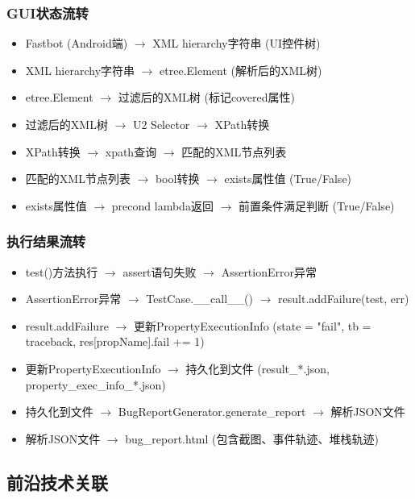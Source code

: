 \documentclass[a4paper, zihao=-4]{ctexart}
\begin{document}
\subsubsection{GUI状态流转}
\begin{itemize}
    \item Fastbot (Android端) $\rightarrow$ XML hierarchy字符串 (UI控件树)
    \item XML hierarchy字符串 $\rightarrow$ etree.Element (解析后的XML树)
    \item etree.Element $\rightarrow$ 过滤后的XML树 (标记covered属性)
    \item 过滤后的XML树 $\rightarrow$ U2 Selector $\rightarrow$ XPath转换
    \item XPath转换 $\rightarrow$ xpath查询 $\rightarrow$ 匹配的XML节点列表
    \item 匹配的XML节点列表 $\rightarrow$ bool转换 $\rightarrow$ exists属性值 (True/False)
    \item exists属性值 $\rightarrow$ precond lambda返回 $\rightarrow$ 前置条件满足判断 (True/False)
\end{itemize}

\subsubsection{执行结果流转}
\begin{itemize}
    \item test()方法执行 $\rightarrow$ assert语句失败 $\rightarrow$ AssertionError异常
    \item AssertionError异常 $\rightarrow$ TestCase.\_\_call\_\_() $\rightarrow$ result.addFailure(test, err)
    \item result.addFailure $\rightarrow$ 更新PropertyExecutionInfo (state = "fail", tb = traceback, res[propName].fail += 1)
    \item 更新PropertyExecutionInfo $\rightarrow$ 持久化到文件 (result\_*.json, property\_exec\_info\_*.json)
    \item 持久化到文件 $\rightarrow$ BugReportGenerator.generate\_report $\rightarrow$ 解析JSON文件
    \item 解析JSON文件 $\rightarrow$ bug\_report.html (包含截图、事件轨迹、堆栈轨迹)
\end{itemize}

\subsection{前沿技术关联}
\end{document}

